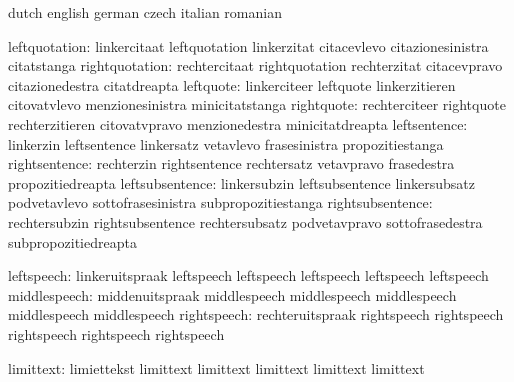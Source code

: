 
\startconstants            dutch                     english
                           german                    czech
                           italian                   romanian

            leftquotation: linkercitaat              leftquotation
                           linkerzitat               citacevlevo
                           citazionesinistra         citatstanga
           rightquotation: rechtercitaat             rightquotation
                           rechterzitat              citacevpravo
                           citazionedestra           citatdreapta
                leftquote: linkerciteer              leftquote
                           linkerzitieren            citovatvlevo
                           menzionesinistra          minicitatstanga
               rightquote: rechterciteer             rightquote
                           rechterzitieren           citovatvpravo
                           menzionedestra            minicitatdreapta
             leftsentence: linkerzin                 leftsentence
                           linkersatz                vetavlevo
                           frasesinistra             propozitiestanga
            rightsentence: rechterzin                rightsentence
                           rechtersatz               vetavpravo
                           frasedestra               propozitiedreapta
          leftsubsentence: linkersubzin              leftsubsentence
                           linkersubsatz             podvetavlevo
                           sottofrasesinistra        subpropozitiestanga
         rightsubsentence: rechtersubzin             rightsubsentence
                           rechtersubsatz            podvetavpravo
                           sottofrasedestra          subpropozitiedreapta

               leftspeech: linkeruitspraak           leftspeech
                           leftspeech                leftspeech
                           leftspeech                leftspeech %
             middlespeech: middenuitspraak           middlespeech
                           middlespeech              middlespeech
                           middlespeech              middlespeech %
              rightspeech: rechteruitspraak          rightspeech
                           rightspeech               rightspeech
                           rightspeech               rightspeech %

                limittext: limiettekst               limittext
                           limittext                 limittext
                           limittext                 limittext

